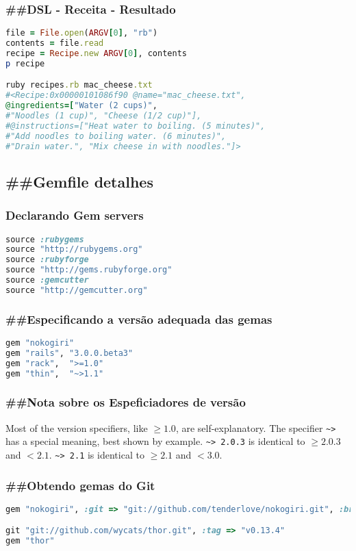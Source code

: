 \documentclass[serif,mathserif]{article}
\begin{document}
\subsubsection{\#\#DSL - Receita - Resultado}
\begin{lstlisting}[language=ruby]
file = File.open(ARGV[0], "rb")
contents = file.read
recipe = Recipe.new ARGV[0], contents
p recipe

ruby recipes.rb mac_cheese.txt 
#<Recipe:0x00000101086f90 @name="mac_cheese.txt", 
@ingredients=["Water (2 cups)", 
#"Noodles (1 cup)", "Cheese (1/2 cup)"], 
#@instructions=["Heat water to boiling. (5 minutes)", 
#"Add noodles to boiling water. (6 minutes)", 
#"Drain water.", "Mix cheese in with noodles."]>
\end{lstlisting}


\subsection{\#\#Gemfile detalhes}

\subsubsection{Declarando Gem servers}
\begin{lstlisting}[language=ruby]
source :rubygems
source "http://rubygems.org"
source :rubyforge
source "http://gems.rubyforge.org"
source :gemcutter
source "http://gemcutter.org"
\end{lstlisting}

\subsubsection{\#\#Especificando a versão adequada das gemas}
\begin{lstlisting}[language=ruby]
gem "nokogiri"
gem "rails", "3.0.0.beta3"
gem "rack",  ">=1.0"
gem "thin",  "~>1.1"
\end{lstlisting}

\subsubsection{\#\#Nota sobre os Espeficiadores de versão}
Most of the version specifiers, like $\geq 1.0$, are self-explanatory. The specifier \verb|~>| has a special meaning, best shown by example. \verb|~> 2.0.3| is identical to $\geq 2.0.3$ and $<  2.1$. \verb|~> 2.1| is identical to $ \geq 2.1$ and $< 3.0$.

\subsubsection{\#\#Obtendo gemas do Git}
\begin{lstlisting}[language=ruby]
gem "nokogiri", :git => "git://github.com/tenderlove/nokogiri.git", :branch => "1.4"

git "git://github.com/wycats/thor.git", :tag => "v0.13.4"
gem "thor"
\end{lstlisting}
\end{document}
